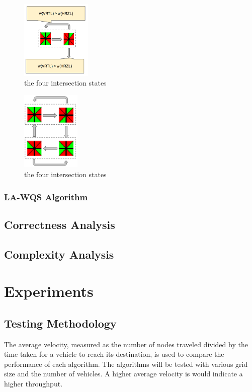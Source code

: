 \documentclass[conference]{IEEEtran}
\begin{document}
\begin{figure}[h]
    \center    
    \includegraphics[width=0.3\textwidth]{images/wqs_decision.png}
	\caption{the four intersection states}
	\label{intersection_states}
\end{figure}

\begin{figure}[h]
    \center    
    \includegraphics[width=0.25\textwidth]{images/wqs_state.png}
	\caption{the four intersection states}
	\label{intersection_states}
\end{figure}


\subsubsection{ LA-WQS Algorithm}

\subsection{Correctness Analysis}

\subsection{ Complexity Analysis}


\section{Experiments}
\subsection{Testing Methodology}
The average velocity, measured as the number of nodes traveled divided by the time taken for a vehicle to reach its destination, is used to compare the performance of each algorithm. The algorithms will be tested with various grid size and the number of vehicles. A higher average velocity is would indicate a higher throughput.
\end{document}
